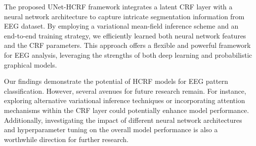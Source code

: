 \documentclass[conference]{IEEEtran}
\begin{document}
The proposed UNet-HCRF framework integrates a latent CRF layer with a neural
network architecture to capture intricate segmentation information from EEG
dataset. By employing a variational mean-field inference scheme and an
end-to-end training strategy, we efficiently learned both neural network
features and the CRF parameters. This approach offers a flexible and powerful
framework for EEG analysis, leveraging the strengths of both deep learning and
probabilistic graphical models.


Our findings demonstrate the potential of HCRF models for EEG pattern
classification. However, several avenues for future research remain. For
instance, exploring alternative variational inference techniques or
incorporating attention mechanisms within the CRF layer could potentially
enhance model performance. Additionally, investigating the impact of different
neural network architectures and hyperparameter tuning on the overall model
performance is also a worthwhile direction for further research.




\end{document}
